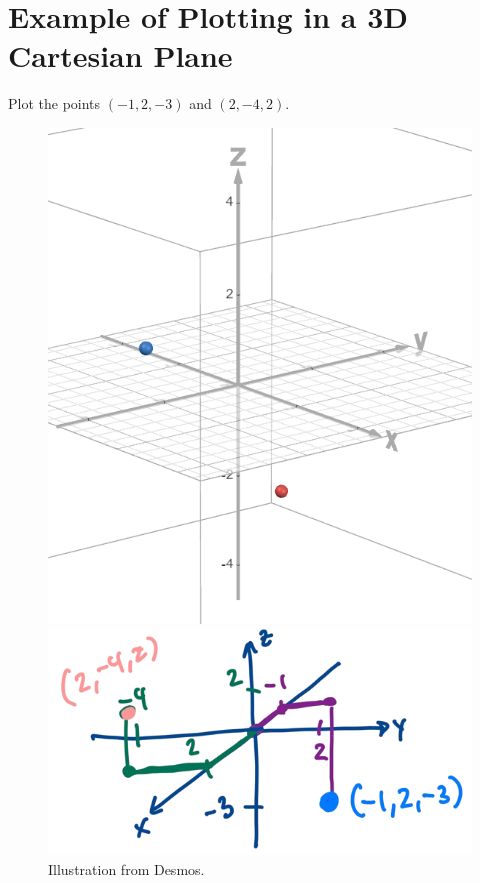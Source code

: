 \documentclass{article}
\begin{document}
\section*{Example of Plotting in a 3D Cartesian Plane}
\begin{examplebox}
Plot the points \( (-1, 2, -3) \) and \( (2, -4, 2) \).
\begin{illustrationbox}
    \begin{blankbox}
    \begin{figure}[H]
        \centering
        \begin{minipage}{0.35\textwidth}
            \centering
            \includegraphics[width=\linewidth]{plotting the 2 points.png}
            \caption{Illustration from Desmos.}
            \label{fig:3d_point1}
        \end{minipage}
        \hfill
        \begin{minipage}{0.6\textwidth}
            \centering
            \includegraphics[width=\linewidth]{plotting the 2 points (from lecture).png}

\end{minipage}
\end{figure}
\end{blankbox}
\end{illustrationbox}
\end{examplebox}
\end{document}
